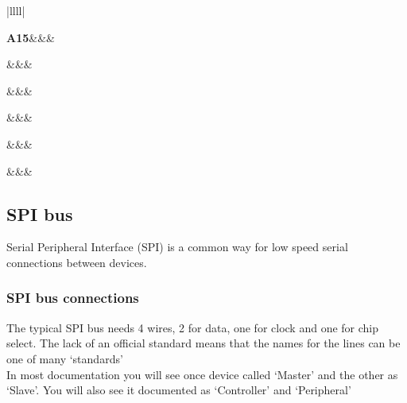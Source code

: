 \documentclass{ol-softwaremanual}
\begin{document}
\begin{ffcode}
\begin{table}[H]
\begin{adjustbox}{width=0.2\textwidth,center=1\textwidth}
\begin{tabular}{|llll|}
\hline

{\textbf{A15}}&&&\\ \hline

&&&\\ \hline

&&&\\ \hline

&&&\\ \hline

&&&\\ \hline

&&&\\ \hline

\end{tabular}
\end{adjustbox}
\end{table}


\pagebreak

\subsection{SPI bus}
Serial Peripheral Interface (SPI) is a common way for low speed serial connections between devices.\\

\subsubsection{SPI bus connections}

The typical SPI bus needs 4 wires, 2 for data, one for clock and one for chip select. The lack of an official standard means that the names for the lines can be one of many ‘standards’\\

In most documentation you will see once device called ‘Master’ and the other as ‘Slave’. You will also see it documented as ‘Controller’ and ‘Peripheral’\\


\end{ffcode}
\end{document}
